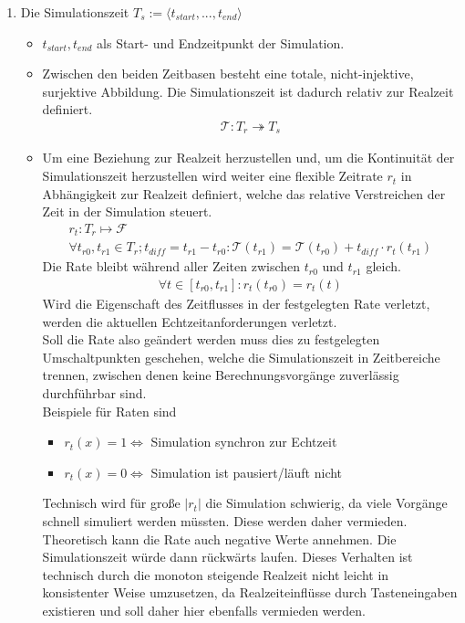 \begin{enumerate}
\item Die Simulationszeit $T_s := \langle t_{start}, ... , t_{end}\rangle$
	\begin{itemize}
	\item $t_{start}, t_{end}$ als Start- und Endzeitpunkt der Simulation.
	\item Zwischen den beiden Zeitbasen besteht eine totale, nicht-injektive, surjektive Abbildung. Die Simulationszeit ist dadurch relativ zur Realzeit definiert.
\begin{align}
	\mathcal{T}:T_r \twoheadrightarrow T_s
\end{align}
	\item Um eine Beziehung zur Realzeit herzustellen \cite[p.3]{Suri00} und, um die Kontinuität der Simulationszeit herzustellen wird weiter eine flexible Zeitrate $r_t$ in Abhängigkeit zur Realzeit definiert, welche das relative Verstreichen der Zeit in der Simulation steuert.
\begin{align}
r_t:T_r\mapsto\mathcal{F}\\
 \forall t_{r0},  t_{r1} \in T_r ; t_{diff}=t_{r1}-t_{r0} :\mathcal{T}(t_{r1}) = \mathcal{T}(t_{r0}) + t_{diff}\cdot r_t(t_{r1})
\end{align}
Die Rate bleibt während aller Zeiten zwischen $t_{r0}$ und $t_{r1}$ gleich.
\begin{align}
 \forall t \in [ t_{r0},t_{r1}]: r_t( t_{r0}) = r_t(t)
\end{align} Wird die Eigenschaft des Zeitflusses in der festgelegten Rate verletzt, werden die aktuellen Echtzeitanforderungen verletzt. \\
	Soll die Rate also geändert werden muss dies zu festgelegten Umschaltpunkten geschehen, welche die Simulationszeit in Zeitbereiche trennen, zwischen denen keine Berechnungsvorgänge zuverlässig durchführbar sind.\\
Beispiele für Raten sind 
\begin{itemize}
\item $r_t(x) = 1 \Leftrightarrow$ Simulation synchron zur Echtzeit
\item $r_t(x) = 0 \Leftrightarrow$ Simulation ist pausiert/läuft nicht
\end{itemize}
Technisch wird für große $|r_t|$ die Simulation schwierig, da viele Vorgänge schnell simuliert werden müssten. Diese werden daher vermieden.\\
Theoretisch kann die Rate auch negative Werte annehmen. Die Simulationszeit würde dann rückwärts laufen. Dieses Verhalten ist technisch durch die monoton steigende Realzeit nicht leicht in konsistenter Weise umzusetzen, da Realzeiteinflüsse durch Tasteneingaben existieren und soll daher hier ebenfalls vermieden werden.
	\end{itemize}
\end{enumerate}	

